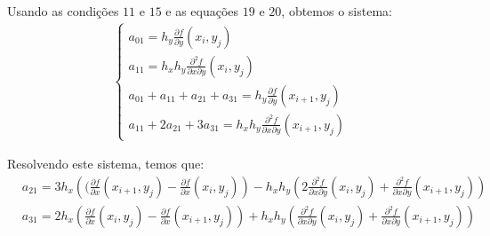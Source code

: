 \documentclass[a4paper, 12pt]{article}
\begin{document}
Usando as condições $11$ e $15$ e as equações $19$ e $20$, obtemos o sistema:
\begin{align*}
    \begin{cases}
        a_{01} = h_{y} \frac{\partial f}{\partial y}(x_i, y_j) \\
        a_{11} = h_x h_y \frac{\partial^2 f}{\partial x \partial y}(x_i, y_j)\\
        a_{01} + a_{11} + a_{21} + a_{31} = h_y \frac{\partial f}{\partial y}(x_{i+1}, y_j)\\
        a_{11} + 2a_{21} + 3a_{31} =  h_x h_y \frac{\partial^2 f}{\partial x \partial y}(x_{i+1}, y_j)
    \end{cases}
\end{align*}

Resolvendo este sistema, temos que:
\begin{align}
    &a_{21} = 3h_x\left((\frac{\partial f}{\partial x}(x_{i+1}, y_j) - \frac{\partial f}{\partial x}(x_{i}, y_{j})\right) - 
    h_x h_y \left(2\frac{\partial^2 f}{\partial x \partial y}(x_i, y_j) + \frac{\partial^2 f}{\partial x \partial y}(x_{i+1}, y_j) \right)
    \tag{27} \\
    &a_{31} = 2h_x\left(\frac{\partial f}{\partial x}(x_{i}, y_{j}) - \frac{\partial f}{\partial x}(x_{i+1}, y_j)\right) + 
    h_x h_y\left(\frac{\partial^2 f}{\partial x \partial y}(x_i, y_j) + \frac{\partial^2 f}{\partial x \partial y}(x_{i+1}, y_j)\right)
    \tag{28}
\end{align}
\end{document}
